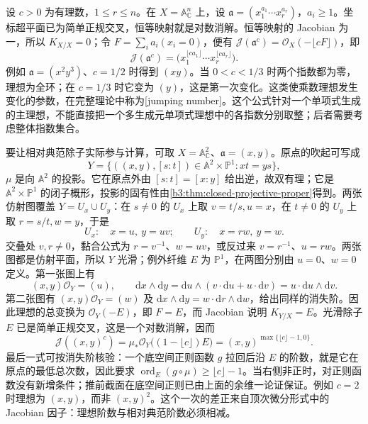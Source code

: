 \begin{example}\label{b3:exm:snc-multiplier-ideal}
	设 \(c>0\) 为有理数，\(1\le r\le n\)。在 \(X=\mathbb A_{\mathbb C}^n\) 上，设 \(\mathfrak a=(x_1^{a_1}\cdots x_r^{a_r})\)，\(a_i\ge1\)。坐标超平面已为简单正规交叉，恒等映射就是对数消解。恒等映射的 Jacobian 为一，所以 \(K_{X/X}=0\)；令 \(F=\sum_i a_i(x_i=0)\)，便有 \(\mathcal J(\mathfrak a^c)=\mathcal O_X(-\lfloor cF\rfloor)\)，即
	\[
		\mathcal J(\mathfrak a^c) =\bigl(x_1^{\lfloor ca_1\rfloor}\cdots x_r^{\lfloor ca_r\rfloor}\bigr).
	\]
	例如 \(\mathfrak a=(x^2y^3)\)、\(c=1/2\) 时得到 \((xy)\)。当 \(0<c<1/3\) 时两个指数都为零，理想为全环；在 \(c=1/3\) 时它变为 \((y)\)，这是第一次变化。这类使乘数理想发生变化的参数，在完整理论中称为[jumping number]。这个公式针对一个单项式生成的主理想，不能直接把一个多生成元单项式理想中的各指数分别取整；后者需要考虑整体指数集合。
\end{example}

要让相对典范除子实际参与计算，可取 \(X=\mathbb A_{\mathbb C}^2\)、\(\mathfrak a=(x,y)\)。原点的吹起可写成
\[
	Y=\{((x,y),[s:t])\in\mathbb A^2\times\mathbb P^1:xt=ys\},
\]
\(\mu\) 是向 \(\mathbb A^2\) 的投影。它在原点外由 \([s:t]=[x:y]\) 给出逆，故双有理；它是 \(\mathbb A^2\times\mathbb P^1\) 的闭子概形，投影的固有性由\cref{b3:thm:closed-projective-proper}得到。两张仿射图覆盖 \(Y=U_x\cup U_y\)：在 \(s\ne0\) 的 \(U_x\) 上取 \(v=t/s,u=x\)，在 \(t\ne0\) 的 \(U_y\) 上取 \(r=s/t,w=y\)，于是
\[
	U_x:\quad x=u,\ y=uv;\qquad U_y:\quad x=rw,\ y=w.
\]
交叠处 \(v,r\ne0\)，黏合公式为 \(r=v^{-1}\)、\(w=uv\)，或反过来 \(v=r^{-1}\)、\(u=rw\)。两张图都是仿射平面，所以 \(Y\) 光滑；例外纤维 \(E\) 为 \(\mathbb P^1\)，在两图分别由 \(u=0\)、\(w=0\) 定义。第一张图上有
\[
	(x,y)\mathcal O_Y=(u),\qquad \mathrm{d}x\wedge\mathrm{d}y=\mathrm{d}u\wedge(v\cdot\mathrm{d}u+u\cdot\mathrm{d}v)=u\cdot\mathrm{d}u\wedge\mathrm{d}v.
\]
第二张图有 \((x,y)\mathcal O_Y=(w)\) 及 \(\mathrm{d}x\wedge\mathrm{d}y=w\cdot\mathrm{d}r\wedge\mathrm{d}w\)，给出同样的消失阶。因此理想的总变换为 \(\mathcal O_Y(-E)\)，即 \(F=E\)，而 Jacobian 说明 \(K_{Y/X}=E\)。光滑除子 \(E\) 已是简单正规交叉，这是一个对数消解，因而
\[
	\mathcal J((x,y)^c) =\mu_*\mathcal O_Y\bigl((1-\lfloor c\rfloor)E\bigr) =(x,y)^{\max\{\lfloor c\rfloor-1,0\}}.
\]
最后一式可按消失阶核验：一个底空间正则函数 \(g\) 拉回后沿 \(E\) 的阶数，就是它在原点的最低总次数，因此要求 \(\operatorname{ord}_E(g\circ\mu)\ge\lfloor c\rfloor-1\)。当右侧非正时，对正则函数没有新增条件；推前截面在底空间正则已由上面的余维一论证保证。例如 \(c=2\) 时理想为 \((x,y)\)，而非 \((x,y)^2\)。这个一次的差正来自顶次微分形式中的 Jacobian 因子：理想阶数与相对典范阶数必须相减。


